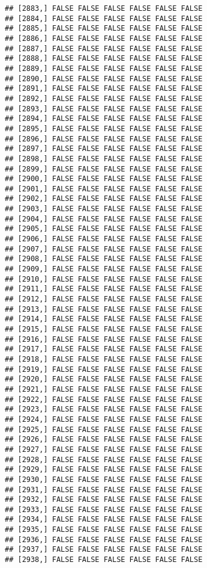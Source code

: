 \documentclass[
]{article}
\begin{document}
\begin{verbatim}
## [2883,] FALSE FALSE FALSE FALSE FALSE FALSE
## [2884,] FALSE FALSE FALSE FALSE FALSE FALSE
## [2885,] FALSE FALSE FALSE FALSE FALSE FALSE
## [2886,] FALSE FALSE FALSE FALSE FALSE FALSE
## [2887,] FALSE FALSE FALSE FALSE FALSE FALSE
## [2888,] FALSE FALSE FALSE FALSE FALSE FALSE
## [2889,] FALSE FALSE FALSE FALSE FALSE FALSE
## [2890,] FALSE FALSE FALSE FALSE FALSE FALSE
## [2891,] FALSE FALSE FALSE FALSE FALSE FALSE
## [2892,] FALSE FALSE FALSE FALSE FALSE FALSE
## [2893,] FALSE FALSE FALSE FALSE FALSE FALSE
## [2894,] FALSE FALSE FALSE FALSE FALSE FALSE
## [2895,] FALSE FALSE FALSE FALSE FALSE FALSE
## [2896,] FALSE FALSE FALSE FALSE FALSE FALSE
## [2897,] FALSE FALSE FALSE FALSE FALSE FALSE
## [2898,] FALSE FALSE FALSE FALSE FALSE FALSE
## [2899,] FALSE FALSE FALSE FALSE FALSE FALSE
## [2900,] FALSE FALSE FALSE FALSE FALSE FALSE
## [2901,] FALSE FALSE FALSE FALSE FALSE FALSE
## [2902,] FALSE FALSE FALSE FALSE FALSE FALSE
## [2903,] FALSE FALSE FALSE FALSE FALSE FALSE
## [2904,] FALSE FALSE FALSE FALSE FALSE FALSE
## [2905,] FALSE FALSE FALSE FALSE FALSE FALSE
## [2906,] FALSE FALSE FALSE FALSE FALSE FALSE
## [2907,] FALSE FALSE FALSE FALSE FALSE FALSE
## [2908,] FALSE FALSE FALSE FALSE FALSE FALSE
## [2909,] FALSE FALSE FALSE FALSE FALSE FALSE
## [2910,] FALSE FALSE FALSE FALSE FALSE FALSE
## [2911,] FALSE FALSE FALSE FALSE FALSE FALSE
## [2912,] FALSE FALSE FALSE FALSE FALSE FALSE
## [2913,] FALSE FALSE FALSE FALSE FALSE FALSE
## [2914,] FALSE FALSE FALSE FALSE FALSE FALSE
## [2915,] FALSE FALSE FALSE FALSE FALSE FALSE
## [2916,] FALSE FALSE FALSE FALSE FALSE FALSE
## [2917,] FALSE FALSE FALSE FALSE FALSE FALSE
## [2918,] FALSE FALSE FALSE FALSE FALSE FALSE
## [2919,] FALSE FALSE FALSE FALSE FALSE FALSE
## [2920,] FALSE FALSE FALSE FALSE FALSE FALSE
## [2921,] FALSE FALSE FALSE FALSE FALSE FALSE
## [2922,] FALSE FALSE FALSE FALSE FALSE FALSE
## [2923,] FALSE FALSE FALSE FALSE FALSE FALSE
## [2924,] FALSE FALSE FALSE FALSE FALSE FALSE
## [2925,] FALSE FALSE FALSE FALSE FALSE FALSE
## [2926,] FALSE FALSE FALSE FALSE FALSE FALSE
## [2927,] FALSE FALSE FALSE FALSE FALSE FALSE
## [2928,] FALSE FALSE FALSE FALSE FALSE FALSE
## [2929,] FALSE FALSE FALSE FALSE FALSE FALSE
## [2930,] FALSE FALSE FALSE FALSE FALSE FALSE
## [2931,] FALSE FALSE FALSE FALSE FALSE FALSE
## [2932,] FALSE FALSE FALSE FALSE FALSE FALSE
## [2933,] FALSE FALSE FALSE FALSE FALSE FALSE
## [2934,] FALSE FALSE FALSE FALSE FALSE FALSE
## [2935,] FALSE FALSE FALSE FALSE FALSE FALSE
## [2936,] FALSE FALSE FALSE FALSE FALSE FALSE
## [2937,] FALSE FALSE FALSE FALSE FALSE FALSE
## [2938,] FALSE FALSE FALSE FALSE FALSE FALSE

\end{verbatim}
\end{document}
